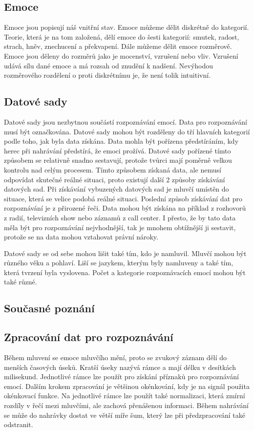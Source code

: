 \documentclass[FM,BP]{tulthesis}
\begin{document}
\subsection{Emoce}
Emoce jsou popisují náš vnitřní stav. Emoce můžeme dělit diskrétně do kategorií. Teorie, která je na tom založená, dělí emoce do šesti kategorií: smutek, radost, strach, hněv, znechucení a překvapení. Dále můžeme dělit emoce rozměrově. Emoce jsou děleny do rozměrů jako je mocenství, vzrušení nebo vliv. Vzrušení udává sílu dané emoce a má rozsah od znudění k nadšení. Nevýhodou rozměrového rozdělení o proti diskrétnímu je, že není tolik intuitivní.\cite{DBLP:journals/speech/AkcayO20}

\subsection{Datové sady}
Datové sady jsou nezbytnou součástí rozpoznávání emocí. Data pro rozpoznávání musí být označkována. Datové sady mohou být rozděleny do tří hlavních kategorií podle toho, jak byla data získána. Data mohla být pořízena předstíráním, kdy herec při nahrávání předstírá, že emoci prožívá. Datové sady pořízené tímto způsobem se relativně snadno sestavují, protože tvůrci mají poměrně velkou kontrolu nad celým procesem. Tímto způsobem získaná data, ale nemusí odpovídat skutečné reálné situaci, proto existují další 2 způsoby získávání datových sad. Při získávání vybuzených datových sad je mluvčí umístěn do situace, která se velice podobá reálné situaci. Poslední způsob získávání dat pro rozpoznávání je z přirozené řeči. Data mohou být získána na příklad z rozhovorů z radií, televizních show nebo záznamů z call center. I přesto, že by tato data měla být pro rozpoznávání nejvhodnější, tak je mnohem obtížnější ji sestavit, protože se na data mohou vztahovat právní nároky.\cite{DBLP:journals/speech/AkcayO20}

Datové sady se od sebe mohou lišit také tím, kdo je namluvil. Mluvčí mohou být různého věku a pohlaví. Liší se jazykem, kterým byly namluveny a také tím, která tvrzení byla vyslovena. Počet a kategorie rozpoznávacích emocí mohou být také různé.\cite{DBLP:journals/speech/AkcayO20}

\subsection{Současné poznání}

\subsection{Zpracování dat pro rozpoznávání}
Během mluvení se emoce mluvčího mění, proto se zvukový záznam dělí do menších časových úseků. Kratší úseky nazývá rámce a mají délku v desítkách milisekund. Jednotlivé rámce lze použít pro získání příznaků pro rozpoznávání emocí. Dalším krokem zpracování je většinou okénkování, kdy je na signál použita okénkovací funkce. Na jednotlivé rámce lze použít také normalizaci, která zmírní rozdíly v řečí mezi mluvčími, ale zachová přenášenou informaci. Během nahrávání se může do nahrávky dostat ve větší míře šum, který lze při předzpracování také odstranit.\cite{DBLP:journals/speech/AkcayO20}
\end{document}
